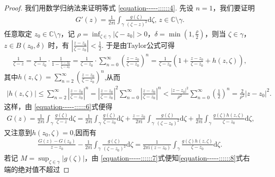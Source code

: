 \documentclass[../../main.tex]{subfiles}%
\begin{document}
\begin{proof}
我们用数学归纳法来证明等式 \eqref{equation-----::::::4}. 先设 \( n = 1 \)，我们要证明
\begin{align}\label{equation-----::::::5}
G'(z) = \frac{1}{2\pi \mathrm{i}} \int_{\gamma} \frac{g(\zeta)}{(\zeta - z)^2} \mathrm{d}\zeta, \, z \in \mathbb{C} \setminus \gamma. 
\end{align}
任意取定 \( z_0 \in \mathbb{C} \setminus \gamma \)，记 \( \rho = \inf_{\zeta \in \gamma} |\zeta - z_0| > 0 \)，\( \delta = \min\left(1, \frac{\rho}{2}\right) \)，则当 \( \zeta \in \gamma \)，\( z \in B(z_0, \delta) \) 时，有 \( \left| \frac{z - z_0}{\zeta - z_0} \right| < \frac{1}{2} \). 于是由Taylor公式可得
\begin{align}\label{equation-----::::::6}
\frac{1}{\zeta -z}=\frac{1}{\zeta -z_0}\cdot \frac{1}{1-\frac{z-z_0}{\zeta -z_0}}=\frac{1}{\zeta -z_0}\cdot \sum_{n=0}^{\infty}{\left( \frac{z-z_0}{\zeta -z_0} \right) ^n}=\frac{1}{\zeta -z_0}\left( 1+\frac{z-z_0}{\zeta -z_0}+h(z,\zeta ) \right) ,
\end{align}
其中$h(z,\zeta)=\sum_{n=2}^{\infty}{\left( \frac{z-z_0}{\zeta -z_0} \right)^n}$,从而
\begin{align}\label{equation-----::::::7}
|h(z,\zeta )|\leqslant \sum_{n=2}^{\infty}{\left| \frac{z-z_0}{\zeta -z_0} \right|^n}=\left| \frac{z-z_0}{\zeta -z_0} \right|^2\sum_{n=0}^{\infty}{\left| \frac{z-z_0}{\zeta -z_0} \right|^n}<\frac{|z-z_0|^2}{\rho ^2}\sum_{n=0}^{\infty}{\left( \frac{1}{2} \right) ^n}=\frac{2}{\rho ^2}|z-z_0|^2.
\end{align}
这样，由 \eqref{equation-----::::::6}式便得
\begin{align*}
G(z) = \frac{1}{2\pi \mathrm{i}} \int_{\gamma} \frac{g(\zeta)}{\zeta - z} \mathrm{d}\zeta = \frac{1}{2\pi \mathrm{i}} \int_{\gamma} \frac{g(\zeta)}{\zeta - z_0} \mathrm{d}\zeta + \frac{z - z_0}{2\pi \mathrm{i}} \int_{\gamma} \frac{g(\zeta)}{(\zeta - z_0)^2} \mathrm{d}\zeta   + \frac{1}{2\pi \mathrm{i}} \int_{\gamma} \frac{g(\zeta)h(z, \zeta)}{\zeta - z_0} \mathrm{d}\zeta,
\end{align*}
又注意到$h(z_0,\zeta)=0$,因而有
\begin{align}
\frac{G(z) - G(z_0)}{z - z_0} - \frac{1}{2\pi \mathrm{i}} \int_{\gamma} \frac{g(\zeta)}{(\zeta - z_0)^2} \mathrm{d}\zeta  = \frac{1}{2\pi \mathrm{i} (z - z_0)} \int_{\gamma} \frac{g(\zeta)h(z, \zeta)}{\zeta - z_0} \mathrm{d}\zeta. \label{equation-----::::::8}
\end{align}
若记 \( M = \sup_{\zeta \in \gamma} |g(\zeta)| \)，由 \eqref{equation-----::::::7}式便知\eqref{equation-----::::::8}式右端的绝对值不超过

\end{proof}
\end{document}
